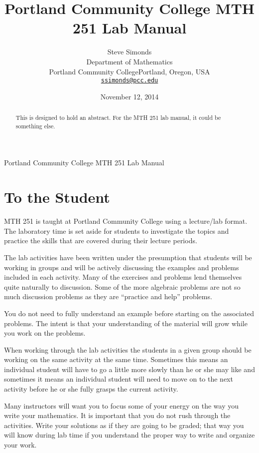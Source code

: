 \documentclass[12pt,draft,]{article}
\title{Portland Community College MTH 251 Lab Manual}
\author{Steve Simonds\\
Department of Mathematics\\
Portland Community College\newline Portland, Oregon, USA\\
\href{mailto:ssimonds@pcc.edu}{\nolinkurl{ssimonds@pcc.edu}}
}
\date{November 12, 2014}
\theoremstyle{plain}
\theoremstyle{definition}
\begin{document}
%
\maketitle
%
\thispagestyle{empty}
%
\begin{abstract}
This is designed to hold an abstract. For the MTH 251 lab manual, it could be something else.
%
\end{abstract}
%
Portland Community College MTH 251 Lab Manual\typeout{************************************************}
\typeout{************************************************}
%
\section*{To the Student}\label{section-1}
%
MTH 251 is taught at Portland Community College using a lecture/lab format. The laboratory time
            is set aside for students to investigate the topics and practice the skills that are covered during
            their lecture periods. 
%
\par The lab activities have been written under the presumption that students will be working in groups
            and will be actively discussing the examples and problems included in each activity. Many of the
            exercises and problems lend themselves quite naturally to discussion. Some of the more algebraic
            problems are not so much discussion problems as they are ``practice and help'' problems. 
%
\par You do not need to fully understand an example before starting on the associated problems. The
            intent is that your understanding of the material will grow while you work on the problems.
%
\par When working through the lab activities the students in a given group should be working on the
            same activity at the same time. Sometimes this means an individual student will have to go a little
            more slowly than he or she may like and sometimes it means an individual student will need to move
            on to the next activity before he or she fully grasps the current activity.
%
\par Many instructors will want you to focus some of your energy on the way you write your mathematics.
            It is important that you do not rush through the activities. Write your solutions as if they are
            going to be graded; that way you will know during lab time if you understand the proper way to write
            and organize your work.
\end{document}
